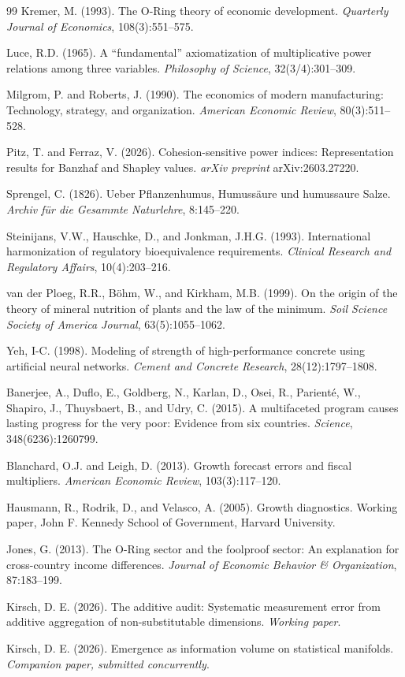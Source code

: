 \documentclass[12pt, a4paper]{article}
\theoremstyle{definition}
\theoremstyle{remark}
\begin{document}
\begin{thebibliography}{99}
Kremer, M. (1993). The O-Ring theory of economic development. \textit{Quarterly Journal of Economics}, 108(3):551--575.

Luce, R.D. (1965). A ``fundamental'' axiomatization of multiplicative power relations among three variables. \textit{Philosophy of Science}, 32(3/4):301--309.

Milgrom, P. and Roberts, J. (1990). The economics of modern manufacturing: Technology, strategy, and organization. \textit{American Economic Review}, 80(3):511--528.

Pitz, T. and Ferraz, V. (2026). Cohesion-sensitive power indices: Representation results for Banzhaf and Shapley values. \textit{arXiv preprint} arXiv:2603.27220.

Sprengel, C. (1826). Ueber Pflanzenhumus, Humuss\"aure und humussaure Salze. \textit{Archiv f\"ur die Gesammte Naturlehre}, 8:145--220.

Steinijans, V.W., Hauschke, D., and Jonkman, J.H.G. (1993). International harmonization of regulatory bioequivalence requirements. \textit{Clinical Research and Regulatory Affairs}, 10(4):203--216.

van der Ploeg, R.R., B\"ohm, W., and Kirkham, M.B. (1999). On the origin of the theory of mineral nutrition of plants and the law of the minimum. \textit{Soil Science Society of America Journal}, 63(5):1055--1062.

Yeh, I-C. (1998). Modeling of strength of high-performance concrete using artificial neural networks. \textit{Cement and Concrete Research}, 28(12):1797--1808.

Banerjee, A., Duflo, E., Goldberg, N., Karlan, D., Osei, R., Parient\'e, W., Shapiro, J., Thuysbaert, B., and Udry, C. (2015). A multifaceted program causes lasting progress for the very poor: Evidence from six countries. \textit{Science}, 348(6236):1260799.

Blanchard, O.J. and Leigh, D. (2013). Growth forecast errors and fiscal multipliers. \textit{American Economic Review}, 103(3):117--120.

Hausmann, R., Rodrik, D., and Velasco, A. (2005). Growth diagnostics. Working paper, John F. Kennedy School of Government, Harvard University.

Jones, G. (2013). The O-Ring sector and the foolproof sector: An explanation for cross-country income differences. \textit{Journal of Economic Behavior \& Organization}, 87:183--199.

Kirsch, D. E. (2026). The additive audit: Systematic measurement error from additive aggregation of non-substitutable dimensions. \textit{Working paper}.

Kirsch, D. E. (2026). Emergence as information volume on statistical manifolds. \textit{Companion paper, submitted concurrently}.

\end{thebibliography}
\end{document}
